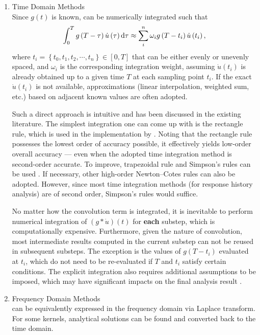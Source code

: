 \begin{enumerate}
\item Time Domain Methods\\
Since $g(t)$ is known,  can be numerically integrated such that
\begin{gather}
\int_0^Tg\left(T-\tau\right)\dot{u}\left(\tau\right)\mathrm{d}\tau\approx\sum_i^n\omega_ig\left(T-t_i\right)\dot{u}\left(t_i\right),
\end{gather}
where $t_i=\left\{t_0,t_1,t_2,\cdots,t_n\right\}\in[0,T]$ that can be either evenly or unevenly spaced, and $\omega_i$ is the corresponding integration weight, assuming $\dot{u}(t_i)$ is already obtained up to a given time $T$ at each sampling point $t_i$. If the exact $\dot{u}(t_i)$ is not available, approximations (linear interpolation, weighted sum, etc.) based on adjacent known values are often adopted.

Such a direct approach is intuitive and has been discussed in the existing literature. The simplest integration one can come up with is the rectangle rule, which is used in the implementation by \citet{Puthanpurayil2014}. Noting that the rectangle rule possesses the lowest order of accuracy possible, it effectively yields low-order overall accuracy --- even when the adopted time integration method is second-order accurate. To improve, trapezoidal rule \citep{Liu2014} and Simpson's rules can be used \citep{Shen2019}. If necessary, other high-order Newton--Cotes rules can also be adopted. However, since most time integration methods (for response history analysis) are of second order, Simpson's rules would suffice.

No matter how the convolution term is integrated, it is inevitable to perform numerical integration of $(g*\dot{u})(t)$ for \textbf{each} substep, which is computationally expensive. Furthermore, given the nature of convolution, most intermediate results computed in the current substep can not be reused in subsequent substeps. The exception is the values of $g(T-t_i)$ evaluated at $t_i$, which do not need to be re-evaluated if $T$ and $t_i$ satisfy certain conditions. The explicit integration also requires additional assumptions to be imposed, which may have significant impacts on the final analysis result \citep[see][]{Liu2014}.
\item Frequency Domain Methods\\
 can be equivalently expressed in the frequency domain via Laplace transform. For some kernels, analytical solutions can be found and converted back to the time domain.
\end{enumerate}